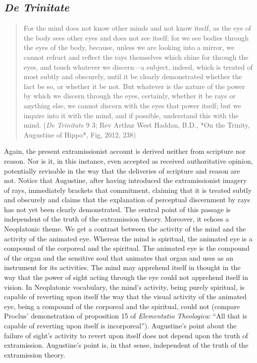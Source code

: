 \documentclass[12pt]{article}
\begin{document}

\subsection{\emph{De Trinitate}} %
\label{sub:_emph_de_trinitate}

\begin{quote}
	For the mind does not know other minds and not know itself, as the eye of the body sees other eyes and does not see itself; for we see bodies through the eyes of the body, because, unless we are looking into a mirror, we cannot refract and reflect the rays themselves which shine for through the eyes, and touch whatever we discern---a subject, indeed, which is treated of most subtly and obscurely, until it be clearly demonstrated whether the fact be so, or whether it be not. But whatever is the nature of the power by which we discern through the eyes, certainly, whether it be rays or anything else, we cannot discern with the eyes that power itself; but we inquire into it with the mind, and if possible, understand this with the mind. (\emph{De Trinitate} 9 3; Rev Arthur West Haddan, B.D., *On the Trinity, Augustine of Hippo*, Fig, 2012, 238)
\end{quote}
Again, the present extramissionist account is derived neither from scripture nor reason. Nor is it, in this instance, even accepted as received authoritative opinion, potentially revisable in the way that the deliveries of scripture and reason are not. Notice that Augustine, after having introduced the extramissionist imagery of rays, immediately brackets that commitment, claiming that it is treated subtly and obscurely and claims that the explanation of perceptual discernment by rays has not yet been clearly demonstrated. The central point of this passage is independent of the truth of the extramission theory. Moreover, it echoes a Neoplatonic theme. We get a contrast between the activity of the mind and the activity of the animated eye. Whereas the mind is spiritual, the animated eye is a compound of the corporeal and the spiritual. The animated eye is the compound of the organ and the sensitive soul that animates that organ and uses as an instrument for its activities. The mind may apprehend itself in thought in the way that the power of sight acting through the eye could not apprehend itself in vision.  In Neoplatonic vocabulary, the mind's activity, being purely spiritual, is capable of reverting upon itself the way that the visual activity of the animated eye, being a compound of the corporeal and the spiritual, could not (compare Proclus' demonstration of proposition 15 of \emph{Elementatio Theologica}: “All that is capable of reverting upon itself is incorporeal”). Augustine's point about the failure of sight's activity to revert upon itself does not depend upon the truth of extramission. Augustine's point is, in that sense, independent of the truth of the extramission theory.










\nocite{Tourscher:1933rw}



\end{document}

